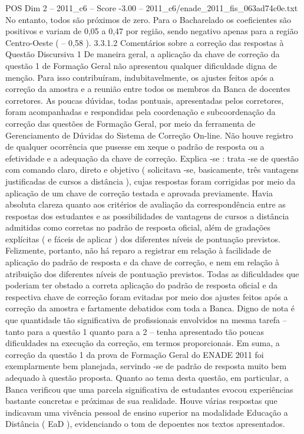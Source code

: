 \begin{textsample}{POS Dim 2 – 2011\_c6 – Score -3.00 – 2011\_c6/enade\_2011\_fis\_063ad74c0e.txt}
No entanto, todos são próximos de zero.
Para o Bacharelado os coeficientes são positivos e variam de 0,05 a 0,47 por região, sendo negativo apenas para a região Centro-Oeste ( – 0,58 ). 3.3.1.2 Comentários sobre a correção das respostas à Questão Discursiva 1 De maneira geral, a aplicação da chave de correção da questão 1 de Formação Geral não apresentou qualquer dificuldade digna de menção.
Para isso contribuíram, indubitavelmente, os ajustes feitos após a correção da amostra e a reunião entre todos os membros da Banca de docentes corretores.
As poucas dúvidas, todas pontuais, apresentadas pelos corretores, foram acompanhadas e respondidas pela coordenação e subcoordenação da correção das questões de Formação Geral, por meio da ferramenta de Gerenciamento de Dúvidas do Sistema de Correção On-line.
Não houve registro de qualquer ocorrência que pusesse em xeque o padrão de resposta ou a efetividade e a adequação da chave de correção.
Explica -se : trata -se de questão com comando claro, direto e objetivo ( solicitava -se, basicamente, três vantagens justificadas de cursos a distância ), cujas respostas foram corrigidas por meio da aplicação de um chave de correção testada e aprovada previamente.
Havia absoluta clareza quanto aos critérios de avaliação da correspondência entre as respostas dos estudantes e as possibilidades de vantagens de cursos a distância admitidas como corretas no padrão de resposta oficial, além de gradações explícitas ( e fáceis de aplicar ) dos diferentes níveis de pontuação previstos.
Felizmente, portanto, não há reparo a registrar em relação à facilidade de aplicação do padrão de resposta e da chave de correção, e nem em relação à atribuição dos diferentes níveis de pontuação previstos.
Todas as dificuldades que poderiam ter obstado a correta aplicação do padrão de resposta oficial e da respectiva chave de correção foram evitadas por meio dos ajustes feitos após a correção da amostra e fartamente debatidos com toda a Banca.
Digno de nota é que quantidade tão significativa de profissionais envolvidos na mesma tarefa – tanto para a questão 1 quanto para a 2 – tenha apresentado tão poucas dificuldades na execução da correção, em termos proporcionais.
Em suma, a correção da questão 1 da prova de Formação Geral do ENADE 2011 foi exemplarmente bem planejada, servindo -se de padrão de resposta muito bem adequado à questão proposta.
Quanto ao tema desta questão, em particular, a Banca verificou que uma parcela significativa de estudantes evocou experiências bastante concretas e próximas de sua realidade.
Houve várias respostas que indicavam uma vivência pessoal de ensino superior na modalidade Educação a Distância ( EaD ), evidenciando o tom de depoentes nos textos apresentados.

\end{textsample}
